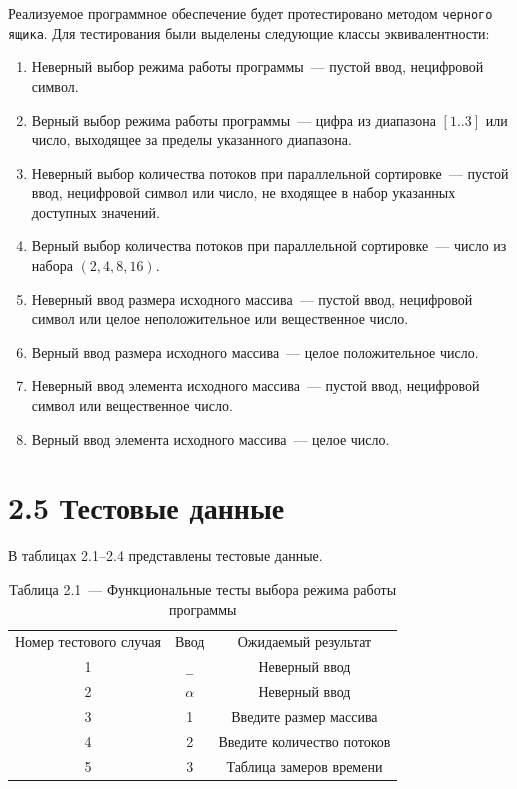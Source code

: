 \documentclass[12pt, a4paper]{report}
\begin{document}
Реализуемое программное обеспечение будет протестировано методом \verb|черного ящика|. Для тестирования были выделены следующие классы эквивалентности:
\begin{enumerate}
	\item Неверный выбор режима работы программы~--- пустой ввод, нецифровой символ.
	\item Верный выбор режима работы программы~--- цифра из диапазона $[1..3]$ или число, выходящее за пределы указанного диапазона.
	\item Неверный выбор количества потоков при параллельной сортировке~--- пустой ввод, нецифровой символ или число, не входящее в набор указанных доступных значений.
	\item Верный выбор количества потоков при параллельной сортировке~--- число из набора $(2, 4, 8, 16)$.
	\item Неверный ввод размера исходного массива~--- пустой ввод, нецифровой символ или целое неположительное или вещественное число.
	\item Верный ввод размера исходного массива~--- целое положительное число.
	\item Неверный ввод элемента исходного массива~--- пустой ввод, нецифровой символ или вещественное число.
	\item Верный ввод элемента исходного массива~--- целое число.
\end{enumerate}

\section*{2.5 Тестовые данные}

В таблицах 2.1--2.4 представлены тестовые данные.

\begin{table} [H]
	\caption*{Таблица 2.1~--- Функциональные тесты выбора режима работы программы}
	\begin{tabular}[l]{|c c c|}
		\hline
		Номер тестового случая & Ввод & Ожидаемый результат  \\
 
		1 & \verb|_|\tablefootnote[1]{Пустой ввод} & Неверный ввод \\\hline 

		2 & $\alpha$ & Неверный ввод \\\hline 

		3 & 1 & Введите размер массива \\\hline 

		4 & 2 & Введите количество потоков \\\hline 

		5 & 3 & Таблица замеров времени \\\hline
	\end{tabular}
\end{table}
\end{document}

